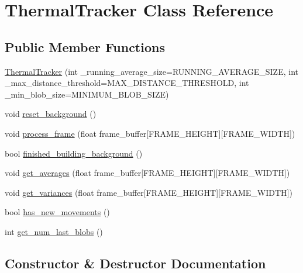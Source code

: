 \hypertarget{class_thermal_tracker}{}\section{Thermal\+Tracker Class Reference}
\label{class_thermal_tracker}
\subsection*{Public Member Functions}
\begin{DoxyCompactItemize}
\item 
\hyperlink{class_thermal_tracker_a1caadec6f2b7dadb9fbc2d046fed7667}{Thermal\+Tracker} (int \+\_\+running\+\_\+average\+\_\+size=R\+U\+N\+N\+I\+N\+G\+\_\+\+A\+V\+E\+R\+A\+G\+E\+\_\+\+S\+I\+ZE, int \+\_\+max\+\_\+distance\+\_\+threshold=M\+A\+X\+\_\+\+D\+I\+S\+T\+A\+N\+C\+E\+\_\+\+T\+H\+R\+E\+S\+H\+O\+LD, int \+\_\+min\+\_\+blob\+\_\+size=M\+I\+N\+I\+M\+U\+M\+\_\+\+B\+L\+O\+B\+\_\+\+S\+I\+ZE)
\item 
void \hyperlink{class_thermal_tracker_add0c0369028bfde64e78789d856eeb57}{reset\+\_\+background} ()
\item 
void \hyperlink{class_thermal_tracker_a73f27eacc99d28db31cab4c7907cf405}{process\+\_\+frame} (float frame\+\_\+buffer\mbox{[}F\+R\+A\+M\+E\+\_\+\+H\+E\+I\+G\+HT\mbox{]}\mbox{[}F\+R\+A\+M\+E\+\_\+\+W\+I\+D\+TH\mbox{]})
\item 
bool \hyperlink{class_thermal_tracker_a8dcae63fef65e199b7ab8afe51bee042}{finished\+\_\+building\+\_\+background} ()
\item 
void \hyperlink{class_thermal_tracker_ac5c7ede96cdd61b65e5c88fb65e6a868}{get\+\_\+averages} (float frame\+\_\+buffer\mbox{[}F\+R\+A\+M\+E\+\_\+\+H\+E\+I\+G\+HT\mbox{]}\mbox{[}F\+R\+A\+M\+E\+\_\+\+W\+I\+D\+TH\mbox{]})
\item 
void \hyperlink{class_thermal_tracker_abba086bc340c336c7e6a14b91ec00ad8}{get\+\_\+variances} (float frame\+\_\+buffer\mbox{[}F\+R\+A\+M\+E\+\_\+\+H\+E\+I\+G\+HT\mbox{]}\mbox{[}F\+R\+A\+M\+E\+\_\+\+W\+I\+D\+TH\mbox{]})
\item 
bool \hyperlink{class_thermal_tracker_ad7cdc3745f2ce5239bb1b7de05f5b711}{has\+\_\+new\+\_\+movements} ()
\item 
int \hyperlink{class_thermal_tracker_aa310ec8521478b8f1f1685ce222140e1}{get\+\_\+num\+\_\+last\+\_\+blobs} ()
\end{DoxyCompactItemize}


\subsection{Constructor \& Destructor Documentation}
